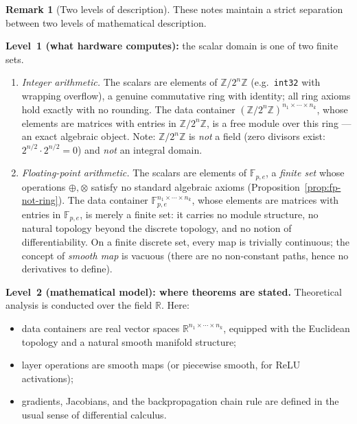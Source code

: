 \documentclass[11pt]{amsart}
\theoremstyle{plain}
\theoremstyle{definition}
\newtheorem{remark}[theorem]{Remark}
\begin{document}
\begin{remark}[Two levels of description]
\label{rem:two-levels}
These notes maintain a strict separation between two levels of mathematical
description.

\medskip
\noindent\textbf{Level~1 (what hardware computes):}
the scalar domain is one of two finite sets.
\begin{enumerate}[label=(\alph*)]
    \item \textit{Integer arithmetic.} The scalars are elements of $\mathbb{Z}/2^n\mathbb{Z}$
    (e.g.\ \texttt{int32} with wrapping overflow), a genuine commutative ring with
    identity; all ring axioms hold exactly with no rounding.  The data container
    $(\mathbb{Z}/2^n\mathbb{Z})^{n_1 \times \cdots \times n_k}$, whose elements are
    matrices with entries in $\mathbb{Z}/2^n\mathbb{Z}$, is a free module over this ring
    — an exact algebraic object.  Note: $\mathbb{Z}/2^n\mathbb{Z}$ is \emph{not} a
    field (zero divisors exist: $2^{n/2} \cdot 2^{n/2} = 0$) and \emph{not} an
    integral domain.

    \item \textit{Floating-point arithmetic.} The scalars are elements of
    $\mathbb{F}_{p,e}$, a \emph{finite set} whose operations $\oplus, \otimes$
    satisfy no standard algebraic axioms (Proposition~\ref{prop:fp-not-ring}).
    The data container $\mathbb{F}_{p,e}^{n_1 \times \cdots \times n_k}$, whose
    elements are matrices with entries in $\mathbb{F}_{p,e}$, is merely a finite
    set: it carries no module structure, no natural topology beyond the discrete
    topology, and no notion of differentiability.  On a finite discrete set, every
    map is trivially continuous; the concept of \emph{smooth map} is vacuous
    (there are no non-constant paths, hence no derivatives to define).
\end{enumerate}

\medskip
\noindent\textbf{Level~2 (mathematical model): where theorems are stated.}
Theoretical analysis is conducted over the field $\mathbb{R}$.  Here:
\begin{itemize}
    \item data containers are real vector spaces $\mathbb{R}^{n_1 \times \cdots \times n_k}$,
    equipped with the Euclidean topology and a natural smooth manifold structure;
    \item layer operations are smooth maps (or piecewise smooth, for ReLU
    activations);
    \item gradients, Jacobians, and the backpropagation chain rule are defined in the
    usual sense of differential calculus.
\end{itemize}


\end{remark}
\end{document}
